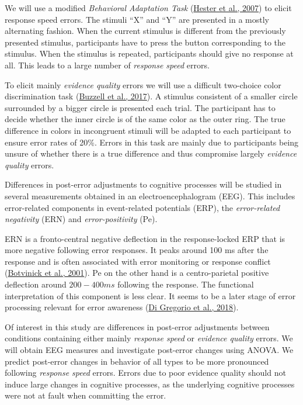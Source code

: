 \documentclass[
  man,floatsintext]{apa7}
\begin{document}
We will use a modified \emph{Behavioral Adaptation Task} (\protect\hyperlink{ref-hester2007post}{Hester et al., 2007}) to elicit response speed errors. The stimuli ``X'' and ``Y'' are presented in a mostly alternating fashion. When the current stimulus is different from the previously presented stimulus, participants have to press the button corresponding to the stimulus. When the stimulus is repeated, participants should give no response at all. This leads to a large number of \emph{response speed} errors.

To elicit mainly \emph{evidence quality} errors we will use a difficult two-choice color discrimination task (\protect\hyperlink{ref-buzzell2017error}{Buzzell et al., 2017}). A stimulus consistent of a smaller circle surrounded by a bigger circle is presented each trial. The participant has to decide whether the inner circle is of the same color as the outer ring. The true difference in colors in incongruent stimuli will be adapted to each participant to ensure error rates of 20\%. Errors in this task are mainly due to participants being unsure of whether there is a true difference and thus compromise largely \emph{evidence quality} errors.

Differences in post-error adjustments to cognitive processes will be studied in several measurements obtained in an electroencephalogram (EEG). This includes error-related components in event-related potentials (ERP), the \emph{error-related negativity} (ERN) and \emph{error-positivity} (Pe).

ERN is a fronto-central negative deflection in the response-locked ERP that is more negative following error responses. It peaks around 100 ms after the response and is often associated with error monitoring or response conflict (\protect\hyperlink{ref-botvinick2001conflict}{Botvinick et al., 2001}).
Pe on the other hand is a centro-parietal positive deflection around \(200 - 400 ms\) following the response. The functional interpretation of this component is less clear. It seems to be a later stage of error processing relevant for error awareness (\protect\hyperlink{ref-di2018errors}{Di Gregorio et al., 2018}).

Of interest in this study are differences in post-error adjustments between conditions containing either mainly \emph{response speed} or \emph{evidence quality} errors. We will obtain EEG measures and investigate post-error changes using ANOVA. We predict post-error changes in behavior of all types to be more pronounced following \emph{response speed} errors. Errors due to poor evidence quality should not induce large changes in cognitive processes, as the underlying cognitive processes were not at fault when committing the error.
\end{document}
